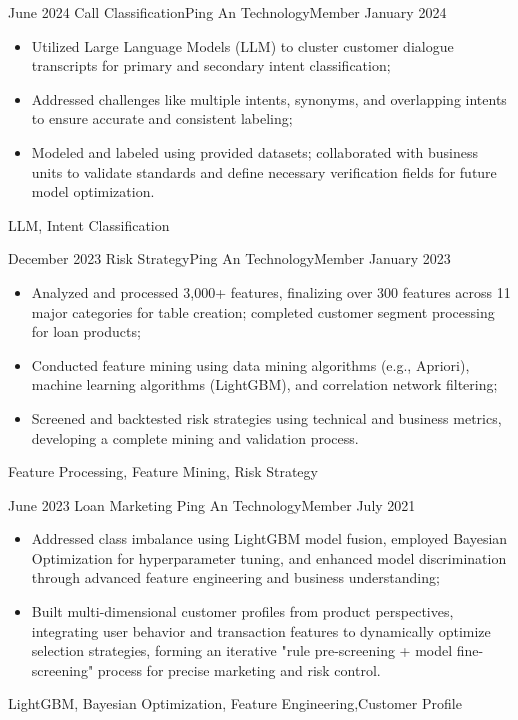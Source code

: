 \begin{experiences}
  \emptySeparator
  \experience
  {June 2024} {Call Classification}{Ping An Technology}{Member}
  {January 2024}    {
				  	\begin{itemize}
				  		\item Utilized Large Language Models (LLM) to cluster customer dialogue transcripts for primary and secondary intent classification;
				  		\item Addressed challenges like multiple intents, synonyms, and overlapping intents to ensure accurate and consistent labeling;
				  		\item Modeled and labeled using provided datasets; collaborated with business units to validate standards and define necessary verification fields for future model optimization.
				  	\end{itemize}
				  }
				  {LLM, Intent Classification}

	\emptySeparator
  \experience
  {December 2023} {Risk Strategy}{Ping An Technology}{Member}
  {January 2023}    {
				  	\begin{itemize}
				  		\item Analyzed and processed 3,000+ features, finalizing over 300 features across 11 major categories for table creation; completed customer segment processing for loan products;
				  		\item Conducted feature mining using data mining algorithms (e.g., Apriori), machine learning algorithms (LightGBM), and correlation network filtering;
				  		\item Screened and backtested risk strategies using technical and business metrics, developing a complete mining and validation process.
				  	\end{itemize}
				  }
				  {Feature Processing, Feature Mining, Risk Strategy}
		  				  
  \emptySeparator
  \experience
  {June 2023} {Loan Marketing }{Ping An Technology}{Member}
  {July 2021}    {
				  	\begin{itemize}
				  		\item Addressed class imbalance using LightGBM model fusion, employed Bayesian Optimization for hyperparameter tuning, and enhanced model discrimination through advanced feature engineering and business understanding;
				  		\item Built multi-dimensional customer profiles from product perspectives, integrating user behavior and transaction features to dynamically optimize selection strategies, forming an iterative "rule pre-screening + model fine-screening" process for precise marketing and risk control.
				  	\end{itemize}
				  }
				  {LightGBM, Bayesian Optimization, Feature Engineering,Customer Profile}
		
\end{experiences}
